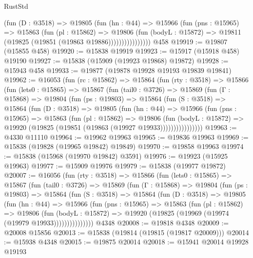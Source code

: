 \begin{lexlean}{RustStd}
\begin{coremodule}
                    (fun (D : @3518) =>
                    @19805
                      (fun (hn : @44) =>
                      @15966
                        (fun (pns : @15965) =>
                        @15863
                          (fun (pl : @15862) =>
                          @19806
                            (fun (bodyL : @15872) =>
                            @19811 (@19825 (@19851 (@19863 @19886))))))))))))))))
    @458
@19919 := @19807 (@15855 @458)
@19920 := @15838 @19919
@19923 := @15917 (@15918 @458) @19190
@19927 := @15838 (@15909 (@19923 @19868) @19872)
@19928 := @15943 @458
@19933 := @19877 (@19878 @19928 @19193 @19839 @19841)
@19962 := @16053
    (fun (rc : @15862) =>
    @15864
      (fun (rty : @3518) =>
      @15866
        (fun (lets0 : @15865) =>
        @15867
          (fun (tail0 : @3726) =>
          @15869
            (fun (Γ : @15868) =>
            @19804
              (fun (ps : @19803) =>
              @15864
                (fun (S : @3518) =>
                @15864
                  (fun (D : @3518) =>
                  @19805
                    (fun (hn : @44) =>
                    @15966
                      (fun (pns : @15965) =>
                      @15863
                        (fun (pl : @15862) =>
                        @19806
                          (fun (bodyL : @15872) =>
                          @19920 (@19825 (@19851 (@19863 (@19927 @19933))))))))))))))))
@19963 := @4330 @11110
@19964 := @19962 @19963
@19965 := @19836 @19963
@19969 := @15838 (@19828 (@19965 @19842) @19849)
@19970 := @19858 @19963
@19974 := @15838 (@15968 (@19970 @19842) @3591)
@19976 := @19923 (@15925 @19963)
@19977 := @15909 @19976
@19979 := @15838 (@19977 @19872)
@20007 := @16056
    (fun (rty : @3518) =>
    @15866
      (fun (lets0 : @15865) =>
      @15867
        (fun (tail0 : @3726) =>
        @15869
          (fun (Γ : @15868) =>
          @19804
            (fun (ps : @19803) =>
            @15864
              (fun (S : @3518) =>
              @15864
                (fun (D : @3518) =>
                @19805
                  (fun (hn : @44) =>
                  @15966
                    (fun (pns : @15965) =>
                    @15863
                      (fun (pl : @15862) =>
                      @19806
                        (fun (bodyL : @15872) =>
                        @19920 (@19825 (@19969 (@19974 (@19979 @19933)))))))))))))))
    @4348
@20008 := @19818 @4348
@20009 := @20008 @15856
@20013 := @15838 (@19814 (@19815 (@19817 @20009)))
@20014 := @15938 @4348
@20015 := @19875 @20014
@20018 := @15941 @20014 @19928 @19193

\end{coremodule}
\end{lexlean}
